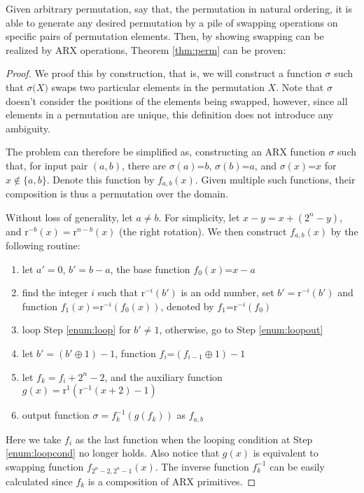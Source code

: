 Given arbitrary permutation, say that, the permutation in natural ordering, it is able to
generate any desired permutation by a pile of swapping operations on specific pairs of
permutation elements. Then, by showing swapping can be realized by ARX operations,
Theorem \ref{thm:perm} can be proven:

\begin{proof}
We proof this by construction, that is, we will construct a function $\sigma$ such that
$\sigma\textit{(X)}$ swaps two particular elements in the permutation $X$. Note that
$\sigma$ doesn't consider the positions of the elements being swapped, however, since all
elements in a permutation are unique, this definition does not introduce any ambiguity.

The problem can therefore be simplified as, constructing an ARX function $\sigma$ such
that, for input pair $(a,b)$, there are $\sigma(a)\textit{=}b$, $\sigma(b)\textit{=}a$,
and $\sigma(x)\textit{=}x$ for $x\notin\{a,b\}$. Denote this function by $f_{a,b}(x)$.
Given multiple such functions, their composition is thus a permutation over the domain.

Without loss of generality, let $a\neq b$. For simplicity, let $x-y=x+(2^n-y)$, and
$\mathrm{r}^{-b}(x)=\mathrm{r}^{n-b}(x)$ (the right rotation). We then construct
$f_{a,b}(x)$ by the following routine:

\begin{enumerate}
\setlength\partopsep{0em}
\setlength\topsep{0em}
\setlength\itemsep{0em}
\setlength\parskip{0em}
\item let $a'=0$, $b'=b-a$, the base function $f_0(x)\textit{=}x-a$
\item find the integer $i$ such that $\mathrm{r}^{-i}(b')$ is an odd number, set
$b'=\mathrm{r}^{-i}(b')$ and function $f_1(x)\textit{=}\mathrm{r}^{-i}(f_0(x))$, denoted
by $f_1\textit{=}\mathrm{r}^{-i}(f_0)$
\item \label{enum:loopcond} loop Step \ref{enum:loop} for $b'\neq1$, otherwise, go to
Step \ref{enum:loopout}
\item \label{enum:loop} let $b'=(b'\oplus1)-1$, function $f_i\textit{=}(f_{i-1}\oplus1)-1$
\item \label{enum:loopout} let $f_k=f_{i}+2^n-2$, and the auxiliary function
$g(x)=\mathrm{r}^1(\mathrm{r}^{-1}(x+2)-1)$
\item output function $\sigma=f_k^{-1}(g(f_k))$ as $f_{a,b}$
\end{enumerate}

\noindent Here we take $f_i$ as the last function when the looping condition at Step
\ref{enum:loopcond} no longer holds. Also notice that $g(x)$ is equivalent to swapping
function $f_{2^n-2,2^n-1}(x)$. The inverse function $f_k^{-1}$ can be easily calculated
since $f_k$ is a composition of ARX primitives.


\end{proof}
